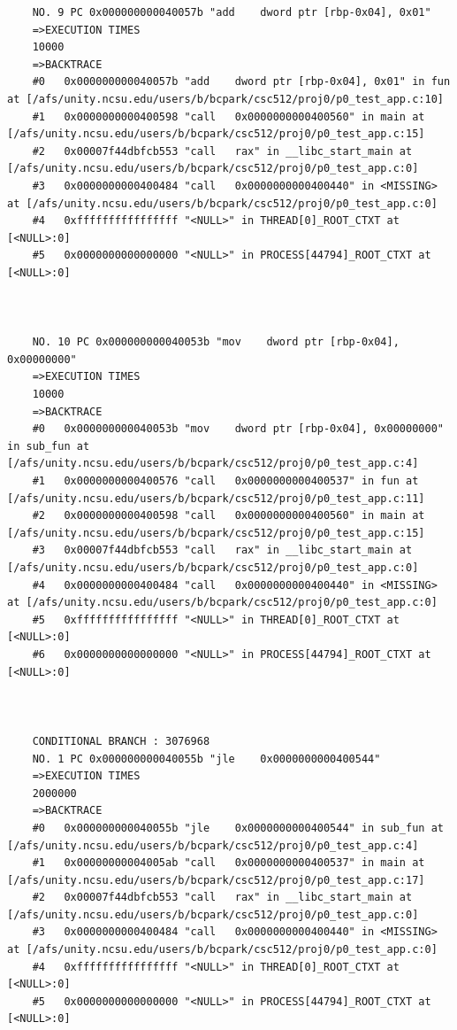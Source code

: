 \documentclass[11pt]{article}
\begin{document}
\begin{verbatim}
    NO. 9 PC 0x000000000040057b "add    dword ptr [rbp-0x04], 0x01"
    =>EXECUTION TIMES
    10000
    =>BACKTRACE
    #0   0x000000000040057b "add    dword ptr [rbp-0x04], 0x01" in fun at [/afs/unity.ncsu.edu/users/b/bcpark/csc512/proj0/p0_test_app.c:10]
    #1   0x0000000000400598 "call   0x0000000000400560" in main at [/afs/unity.ncsu.edu/users/b/bcpark/csc512/proj0/p0_test_app.c:15]
    #2   0x00007f44dbfcb553 "call   rax" in __libc_start_main at [/afs/unity.ncsu.edu/users/b/bcpark/csc512/proj0/p0_test_app.c:0]
    #3   0x0000000000400484 "call   0x0000000000400440" in <MISSING> at [/afs/unity.ncsu.edu/users/b/bcpark/csc512/proj0/p0_test_app.c:0]
    #4   0xffffffffffffffff "<NULL>" in THREAD[0]_ROOT_CTXT at [<NULL>:0]
    #5   0x0000000000000000 "<NULL>" in PROCESS[44794]_ROOT_CTXT at [<NULL>:0]
    
    
    
    NO. 10 PC 0x000000000040053b "mov    dword ptr [rbp-0x04], 0x00000000"
    =>EXECUTION TIMES
    10000
    =>BACKTRACE
    #0   0x000000000040053b "mov    dword ptr [rbp-0x04], 0x00000000" in sub_fun at [/afs/unity.ncsu.edu/users/b/bcpark/csc512/proj0/p0_test_app.c:4]
    #1   0x0000000000400576 "call   0x0000000000400537" in fun at [/afs/unity.ncsu.edu/users/b/bcpark/csc512/proj0/p0_test_app.c:11]
    #2   0x0000000000400598 "call   0x0000000000400560" in main at [/afs/unity.ncsu.edu/users/b/bcpark/csc512/proj0/p0_test_app.c:15]
    #3   0x00007f44dbfcb553 "call   rax" in __libc_start_main at [/afs/unity.ncsu.edu/users/b/bcpark/csc512/proj0/p0_test_app.c:0]
    #4   0x0000000000400484 "call   0x0000000000400440" in <MISSING> at [/afs/unity.ncsu.edu/users/b/bcpark/csc512/proj0/p0_test_app.c:0]
    #5   0xffffffffffffffff "<NULL>" in THREAD[0]_ROOT_CTXT at [<NULL>:0]
    #6   0x0000000000000000 "<NULL>" in PROCESS[44794]_ROOT_CTXT at [<NULL>:0]
    
    
    
    CONDITIONAL BRANCH : 3076968
    NO. 1 PC 0x000000000040055b "jle    0x0000000000400544"
    =>EXECUTION TIMES
    2000000
    =>BACKTRACE
    #0   0x000000000040055b "jle    0x0000000000400544" in sub_fun at [/afs/unity.ncsu.edu/users/b/bcpark/csc512/proj0/p0_test_app.c:4]
    #1   0x00000000004005ab "call   0x0000000000400537" in main at [/afs/unity.ncsu.edu/users/b/bcpark/csc512/proj0/p0_test_app.c:17]
    #2   0x00007f44dbfcb553 "call   rax" in __libc_start_main at [/afs/unity.ncsu.edu/users/b/bcpark/csc512/proj0/p0_test_app.c:0]
    #3   0x0000000000400484 "call   0x0000000000400440" in <MISSING> at [/afs/unity.ncsu.edu/users/b/bcpark/csc512/proj0/p0_test_app.c:0]
    #4   0xffffffffffffffff "<NULL>" in THREAD[0]_ROOT_CTXT at [<NULL>:0]
    #5   0x0000000000000000 "<NULL>" in PROCESS[44794]_ROOT_CTXT at [<NULL>:0]
    

\end{verbatim}
\end{document}
